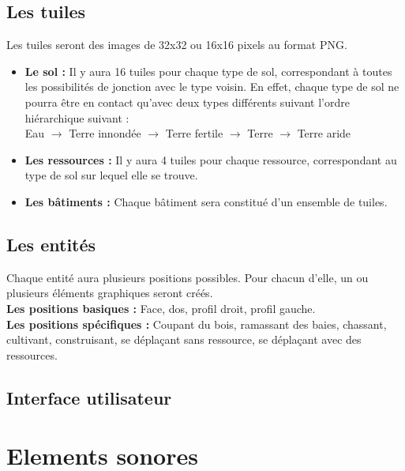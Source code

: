 \documentclass[a4paper]{article}
\newcommand{\alinea}{\hspace*{0.5cm}}
\begin{document}
      \subsection{Les tuiles}
        \label{Tuile}
        \alinea Les tuiles seront des images de 32x32 ou 16x16 pixels au format PNG.\\
        \begin{itemize} \small
          \item \textbf{Le sol :} Il y aura 16 tuiles pour chaque type de sol, correspondant à toutes les possibilités de jonction avec le type voisin. En effet, chaque type de sol ne pourra être en contact qu'avec deux types différents suivant l'ordre hiérarchique suivant :\\
          Eau $\rightarrow$ Terre innondée $\rightarrow$ Terre fertile $\rightarrow$ Terre $\rightarrow$ Terre aride
          \item \textbf{Les ressources :} Il y aura 4 tuiles pour chaque ressource, correspondant au type de sol sur lequel elle se trouve.
          \item \textbf{Les bâtiments :} Chaque bâtiment sera constitué d'un ensemble de tuiles.
        \end{itemize} \normalsize
  
      \subsection{Les entités}
        \alinea Chaque entité aura plusieurs positions possibles. Pour chacun d'elle, un ou plusieurs éléments graphiques seront créés.\\
        \textbf{Les positions basiques :} Face, dos, profil droit, profil gauche.\\
        \textbf{Les positions spécifiques :} Coupant du bois, ramassant des baies, chassant, cultivant, construisant, se déplaçant sans ressource, se déplaçant avec des ressources.
	
      \subsection{Interface utilisateur}
		
    \section{Elements sonores}
    
\end{document}
